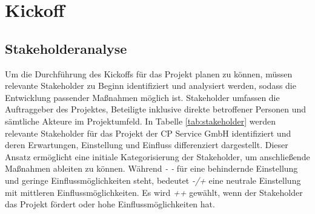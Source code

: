 \chapter{Kickoff}
\label{chapter:5}
\section{Stakeholderanalyse}
Um die Durchführung des Kickoffs für das Projekt planen zu können, müssen relevante Stakeholder zu Beginn identifiziert und analysiert werden, sodass die Entwicklung passender Maßnahmen möglich ist. Stakeholder umfassen die Auftraggeber des Projektes, Beteiligte inklusive direkte betroffener Personen und sämtliche Akteure im Projektumfeld. In Tabelle \ref{tab:stakeholder} werden relevante Stakeholder für das Projekt der CP Service GmbH identifiziert und deren Erwartungen, Einstellung und Einfluss differenziert dargestellt. Dieser Ansatz ermöglicht eine initiale Kategorisierung der Stakeholder, um anschließende Maßnahmen ableiten zu können. Während \textit{\textquotedbl- -\textquotedbl} für eine behindernde Einstellung und geringe Einflussmöglichkeiten steht, bedeutet \textit{\textquotedbl-/+\textquotedbl} eine neutrale Einstellung mit mittleren Einflussmöglichkeiten. Es wird \textit{\textquotedbl++\textquotedbl} gewählt, wenn der Stakeholder das Projekt fördert oder hohe Einflussmöglichkeiten hat.
\vspace{10pt}


